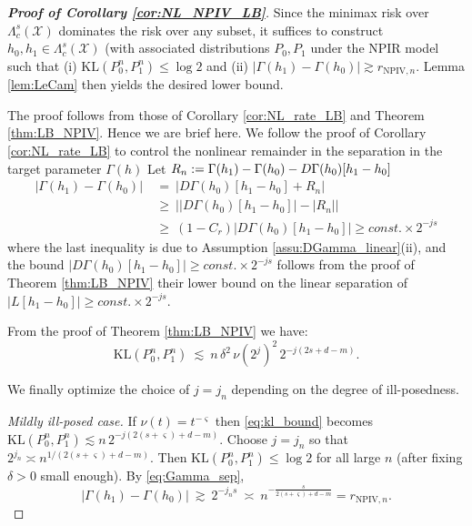 \documentclass[12pt,american]{article}
\theoremstyle{definition}
\theoremstyle{plain}
\theoremstyle{definition}
\theoremstyle{plain}
\theoremstyle{plain}
\theoremstyle{plain}
\theoremstyle{plain}
\theoremstyle{plain}
\newcommand{\abs}[1]{\left| #1 \right|}
\begin{document}
\begin{proof}[\textbf{Proof of Corollary \ref{cor:NL_NPIV_LB}}]

Since the minimax risk over $\Lambda_c^s(\mathcal{X})$ dominates the risk over any subset, it suffices to
construct $h_0,h_1\in\Lambda_c^s(\mathcal{X})$ (with associated distributions $P_0,P_1$ under the NPIR model
such that (i) $\mathrm{KL}(P_0^n,P_1^n)\le\log 2$ and (ii) $\abs{\Gamma(h_1)-\Gamma(h_0)}\gtrsim r_{\mathrm{NPIV},n}$.
Lemma \ref{lem:LeCam} then yields the desired lower bound.

The proof follows from those of Corollary \ref{cor:NL_rate_LB} and Theorem \ref{thm:LB_NPIV}. Hence we are brief here.
We follow the proof of Corollary \ref{cor:NL_rate_LB} to control the nonlinear remainder in the separation in the target parameter $\Gamma(h)$
Let $R_n := \Gamma(h_1)-\Gamma(h_0)-D\Gamma(h_0)[h_1-h_0]$
\begin{align}
\abs{\Gamma(h_1)-\Gamma(h_0)}
\ & =\  \abs{D\Gamma(h_0)[h_1-h_0] + R_n}\nonumber \\
& \geq\  \abs{\abs{D\Gamma(h_0)[h_1-h_0]} - \abs{R_n}}\nonumber\\
& \geq\  (1-C_r)\abs{D\Gamma(h_0)[h_1-h_0]} \geq const.\times 2^{-js} \label{eq:Gamma_sep}
\end{align}
where the last inequality is due to Assumption \ref{assu:DGamma_linear}(ii), and the bound $\abs{D\Gamma(h_0)[h_1-h_0]} \geq const.\times 2^{-js}$ follows from the proof of Theorem \ref{thm:LB_NPIV} their lower bound on the linear separation of $\abs{L[h_1-h_0]} \geq const.\times 2^{-js}$.

From the proof of Theorem \ref{thm:LB_NPIV} we have:
\begin{equation}\label{eq:kl_bound}
\mathrm{KL}(P_0^n,P_1^n)\ \lesssim\ n\,\delta^2\,\nu(2^{j})^2\,2^{-j(2s+d-m)}.
\end{equation}

We finally optimize the choice of $j=j_n$ depending on the degree of ill-posedness.

\emph{Mildly ill-posed case.} If $\nu(t)=t^{-\varsigma}$ then \eqref{eq:kl_bound} becomes
$\mathrm{KL}(P_0^n,P_1^n)\lesssim n\,2^{-j(2(s+\varsigma)+d-m)}$.
Choose $j=j_n$ so that $2^{j_n}\asymp n^{1/(2(s+\varsigma)+d-m)}$.
Then $\mathrm{KL}(P_0^n,P_1^n)\le \log 2$ for all large $n$ (after fixing $\delta>0$ small enough).
By \eqref{eq:Gamma_sep},
\[
\abs{\Gamma(h_1)-\Gamma(h_0)}\ \gtrsim\ 2^{-j_n s}\ \asymp\ n^{-\frac{s}{2(s+\varsigma)+d-m}}
=r_{\mathrm{NPIV},n}.
\]


\end{proof}
\end{document}

